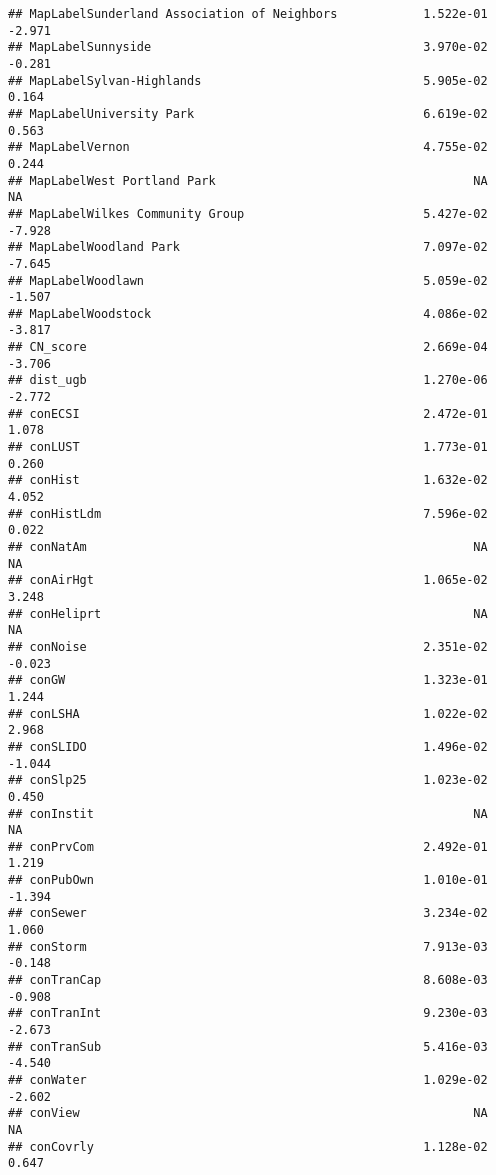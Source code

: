 \documentclass[]{article}
\begin{document}
\begin{verbatim}
## MapLabelSunderland Association of Neighbors            1.522e-01  -2.971
## MapLabelSunnyside                                      3.970e-02  -0.281
## MapLabelSylvan-Highlands                               5.905e-02   0.164
## MapLabelUniversity Park                                6.619e-02   0.563
## MapLabelVernon                                         4.755e-02   0.244
## MapLabelWest Portland Park                                    NA      NA
## MapLabelWilkes Community Group                         5.427e-02  -7.928
## MapLabelWoodland Park                                  7.097e-02  -7.645
## MapLabelWoodlawn                                       5.059e-02  -1.507
## MapLabelWoodstock                                      4.086e-02  -3.817
## CN_score                                               2.669e-04  -3.706
## dist_ugb                                               1.270e-06  -2.772
## conECSI                                                2.472e-01   1.078
## conLUST                                                1.773e-01   0.260
## conHist                                                1.632e-02   4.052
## conHistLdm                                             7.596e-02   0.022
## conNatAm                                                      NA      NA
## conAirHgt                                              1.065e-02   3.248
## conHeliprt                                                    NA      NA
## conNoise                                               2.351e-02  -0.023
## conGW                                                  1.323e-01   1.244
## conLSHA                                                1.022e-02   2.968
## conSLIDO                                               1.496e-02  -1.044
## conSlp25                                               1.023e-02   0.450
## conInstit                                                     NA      NA
## conPrvCom                                              2.492e-01   1.219
## conPubOwn                                              1.010e-01  -1.394
## conSewer                                               3.234e-02   1.060
## conStorm                                               7.913e-03  -0.148
## conTranCap                                             8.608e-03  -0.908
## conTranInt                                             9.230e-03  -2.673
## conTranSub                                             5.416e-03  -4.540
## conWater                                               1.029e-02  -2.602
## conView                                                       NA      NA
## conCovrly                                              1.128e-02   0.647

\end{verbatim}
\end{document}
